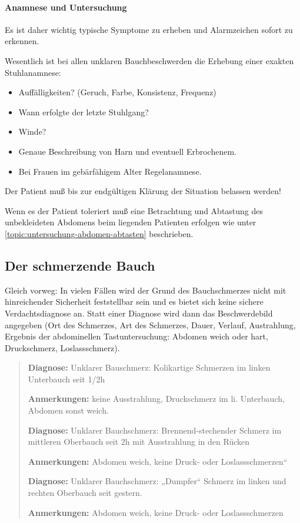 \paragraph{Anamnese und Untersuchung} Es ist daher wichtig
typische Symptome zu erheben und Alarmzeichen sofort zu erkennen.

Wesentlich ist bei allen unklaren Bauchbeschwerden die Erhebung einer exakten Stuhlanamnese:

\begin{itemize}
    \item Auffälligkeiten? (Geruch, Farbe, Konsistenz, Frequenz)
    \item Wann erfolgte der letzte Stuhlgang?
    \item Winde?
    \item Genaue Beschreibung von Harn und eventuell Erbrochenem.
    \item Bei Frauen im gebärfähigem Alter Regelanamnese.
\end{itemize}

Der Patient muß bis zur endgültigen Klärung der Situation
 belassen werden!

Wenn es der Patient toleriert muß eine Betrachtung und
Abtastung des unbekleideten Abdomens beim liegenden
Patienten erfolgen wie unter
\ref{topic:untersuchung-abdomen-abtasten} beschrieben.

\subsection{Der schmerzende Bauch}

Gleich vorweg: In vielen
Fällen wird der Grund des Bauchschmerzes nicht mit
hinreichender Sicherheit feststellbar sein und es bietet sich
keine sichere Verdachtsdiagnose an. Statt einer Diagnose wird
dann das Beschwerdebild angegeben (Ort des Schmerzes, Art des
Schmerzes, Dauer, Verlauf, Austrahlung, Ergebnis der
abdominellen Tastuntersuchung: Abdomen weich oder hart,
Druckschmerz, Loslassschmerz).


\begin{quote}
{\sffamily\bfseries Diagnose:} {\ttfamily Unklarer
Bauschmerz: Kolikartige Schmerzen im linken Unterbauch seit 1/2h }

{\sffamily\bfseries Anmerkungen:} {\ttfamily keine Ausstrahlung, Druckschmerz im li. Unterbauch, Abdomen sonst  weich.}
\vspace{0.5em}

{\sffamily\bfseries Diagnose:} {\ttfamily Unklarer
Bauchschmerz: Brennend-stechender Schmerz im mittleren
Oberbauch seit 2h mit Ausstrahlung in den Rücken}

{\sffamily\bfseries Anmerkungen:} {\ttfamily Abdomen weich,
keine Druck- oder Loslassschmerzen“}
\vspace{0.5em}

{\sffamily\bfseries Diagnose:} {\ttfamily Unklarer
Bauchschmerz: „Dumpfer“ Schmerz im linken und rechten
Oberbauch seit gestern. }

{\sffamily\bfseries Anmerkungen:} {\ttfamily Abdomen
weich, keine Druck- oder Loslassschmerzen}
\end{quote}

